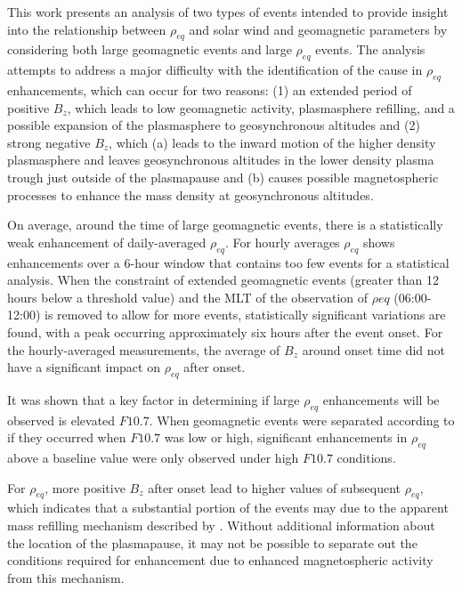 \documentclass[12pt]{article}
\begin{document}
This work presents an analysis of two types of events intended to provide insight into the relationship between $\rho_{eq}$ and solar wind and geomagnetic parameters by considering both large geomagnetic events and large $\rho_{eq}$ events.  The analysis attempts to address a major difficulty with the identification of the cause in $\rho_{eq}$ enhancements, which can occur for two reasons: (1) an extended period of positive $B_z$, which leads to low geomagnetic activity, plasmasphere refilling, and a possible expansion of the plasmasphere to geosynchronous altitudes and (2) strong negative $B_z$, which (a) leads to the inward motion of the higher density plasmasphere and leaves geosynchronous altitudes in the lower density plasma trough just outside of the plasmapause and (b) causes possible magnetospheric processes to enhance the mass density at geosynchronous altitudes.

On average, around the time of large geomagnetic events, there is a statistically weak enhancement of daily-averaged $\rho_{eq}$. For hourly averages $\rho_{eq}$ shows enhancements over a 6-hour window that contains too few events for a statistical analysis.  When the constraint of extended geomagnetic events (greater than 12 hours below a threshold value) and the MLT of the observation of $\rho{eq}$ (06:00-12:00) is removed to allow for more events, statistically significant variations are found, with a peak occurring approximately six hours after the event onset.  For the hourly-averaged measurements, the average of $B_{z}$ around onset time did not have a significant impact on $\rho_{eq}$ after onset.

It was shown that a key factor in determining if large $\rho_{eq}$ enhancements will be observed is elevated $F10.7$.  When geomagnetic events were separated according to if they occurred when $F10.7$ was low or high, significant enhancements in $\rho_{eq}$ above a baseline value were only observed under high $F10.7$ conditions.

For $\rho_{eq}$, more positive $B_{z}$ after onset lead to higher values of subsequent $\rho_{eq}$, which indicates that a substantial portion of the events may due to the apparent mass refilling mechanism described by \cite{Denton2016}.  Without additional information about the location of the plasmapause, it may not be possible to separate out the conditions required for enhancement due to enhanced magnetospheric activity from this mechanism.

\newpage
%

\end{document}
